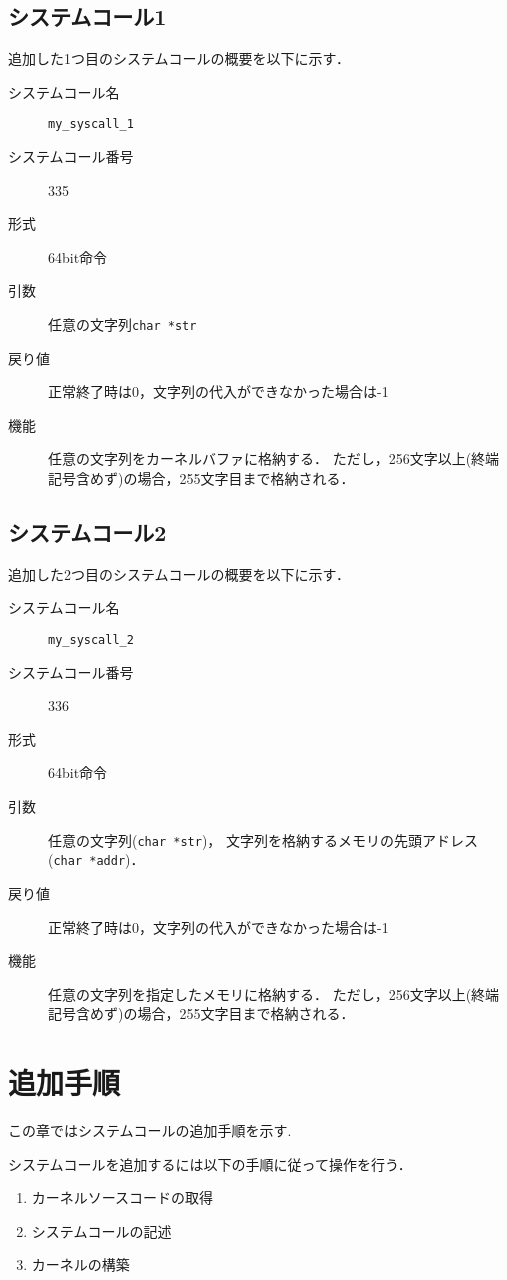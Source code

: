 \documentclass[12pt]{jsarticle}
\begin{document}
\subsection{システムコール1}
追加した1つ目のシステムコールの概要を以下に示す．

\begin{description}
  \item[システムコール名] \verb|my_syscall_1|
  \item[システムコール番号] 335  
  \item[形式] 64bit命令 
  \item[引数] 任意の文字列\verb|char *str|
  \item[戻り値] 正常終了時は0，文字列の代入ができなかった場合は-1 
  \item[機能] 任意の文字列をカーネルバファに格納する．
              ただし，256文字以上(終端記号含めず)の場合，255文字目まで格納される． 
\end{description}


\subsection{システムコール2}
追加した2つ目のシステムコールの概要を以下に示す．

\begin{description}
  \item[システムコール名] \verb|my_syscall_2|
  \item[システムコール番号] 336   
  \item[形式] 64bit命令 
  \item[引数] 任意の文字列(\verb|char *str|)，
            文字列を格納するメモリの先頭アドレス(\verb|char *addr|)．
  \item[戻り値] 正常終了時は0，文字列の代入ができなかった場合は-1 
  \item[機能] 任意の文字列を指定したメモリに格納する．
              ただし，256文字以上(終端記号含めず)の場合，255文字目まで格納される． 
\end{description}

\section{追加手順}
\label{sec:howto}
この章ではシステムコールの追加手順を示す.

システムコールを追加するには以下の手順に従って操作を行う．
\begin{enumerate}
  \item カーネルソースコードの取得
  \item システムコールの記述
  \item カーネルの構築
\end{enumerate}
\end{document}

